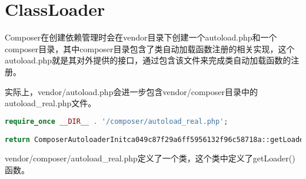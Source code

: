 \section{ClassLoader}


Composer在创建依赖管理时会在vendor目录下创建一个autoload.php和一个composer目录，其中composer目录包含了类自动加载函数注册的相关实现，这个autoload.php就是其对外提供的接口，通过包含该文件来完成类自动加载函数的注册。

实际上，vendor/autoload.php会进一步包含vendor/composer目录中的autoload\_real.php文件。

\begin{lstlisting}[language=PHP]
require_once __DIR__ . '/composer/autoload_real.php';

return ComposerAutoloaderInitca049c87f29a6ff5956132f96c58718a::getLoader();
\end{lstlisting}


vendor/composer/autoload\_real.php定义了一个类，这个类中定义了getLoader()函数。


